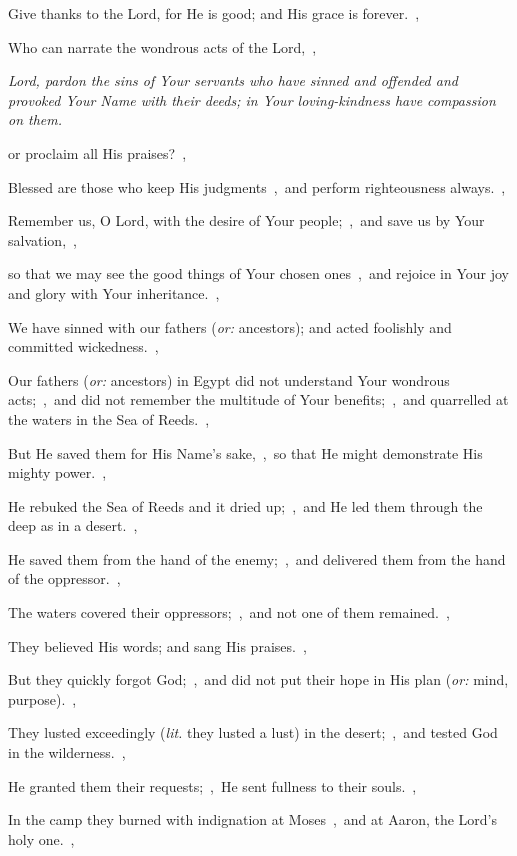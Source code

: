 \documentclass[12pt,twoside,a5paper]{article}
\newcommand{\qanona}[1]{{\liturgicalhint{Qanona.} \emph{#1}}}
\newcommand{\translationoption}[1]{\emph{or:} #1}
\newcommand{\translationliteral}[1]{\emph{lit.} #1}
\begin{document}
\begin{normalparskip}
  Give thanks to the Lord, for He is good; and His grace is forever.~\sep

  Who can narrate the wondrous acts of the Lord,~\sep

  \qanona{Lord, pardon the sins of Your servants who have sinned and offended and provoked Your Name with their deeds; in Your loving-kindness have compassion on them.}

  or proclaim all His praises?~\sep

  Blessed are those who keep His judgments~\sep\ and perform righteousness always.~\sep

  Remember us, O Lord, with the desire of Your people;~\sep\ and save us by Your salvation,~\sep

  so that we may see the good things of Your chosen ones~\sep\ and rejoice in Your joy and glory with Your inheritance.~\sep

  We have sinned with our fathers (\translationoption{ancestors}); and acted foolishly and committed wickedness.~\sep

  Our fathers (\translationoption{ancestors}) in Egypt did not understand Your wondrous acts;~\sep\ and did not remember the multitude of Your benefits;~\sep\ and quarrelled at the waters in the Sea of Reeds.~\sep

  But He saved them for His Name's sake,~\sep\ so that He might demonstrate His mighty power.~\sep

  He rebuked the Sea of Reeds and it dried up;~\sep\ and He led them through the deep as in a desert.~\sep

  He saved them from the hand of the enemy;~\sep\ and delivered them from the hand of the oppressor.~\sep

  The waters covered their oppressors;~\sep\ and not one of them remained.~\sep

  They believed His words; and sang His praises.~\sep

  But they quickly forgot God;~\sep\ and did not put their hope in His plan (\translationoption{mind, purpose}).~\sep

  They lusted exceedingly (\translationliteral{they lusted a lust}) in the desert;~\sep\ and tested God in the wilderness.~\sep

  He granted them their requests;~\sep\ He sent fullness to their souls.~\sep

  In the camp they burned with indignation at Moses~\sep\ and at Aaron, the Lord's holy one.~\sep


\end{normalparskip}
\end{document}

